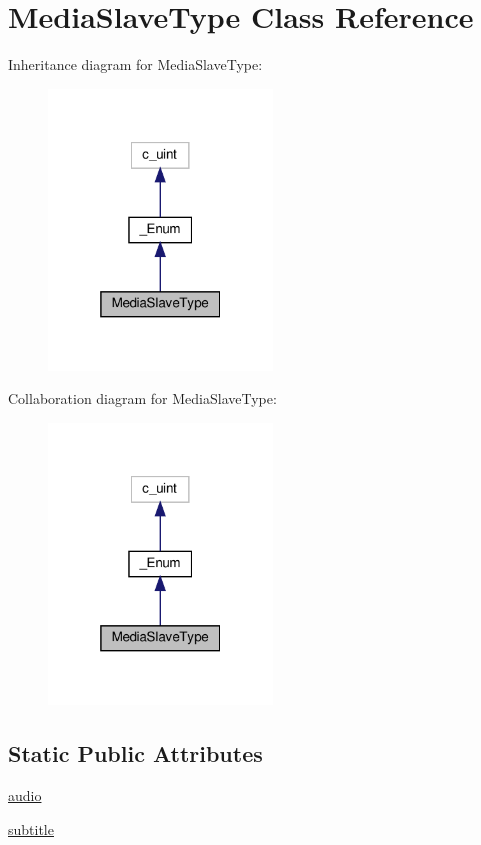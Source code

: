 \hypertarget{classvlc_1_1_media_slave_type}{}\section{Media\+Slave\+Type Class Reference}
\label{classvlc_1_1_media_slave_type}


Inheritance diagram for Media\+Slave\+Type\+:
\nopagebreak
\begin{figure}[H]
\begin{center}
\leavevmode
\includegraphics[width=169pt]{classvlc_1_1_media_slave_type__inherit__graph}
\end{center}
\end{figure}


Collaboration diagram for Media\+Slave\+Type\+:
\nopagebreak
\begin{figure}[H]
\begin{center}
\leavevmode
\includegraphics[width=169pt]{classvlc_1_1_media_slave_type__coll__graph}
\end{center}
\end{figure}
\subsection*{Static Public Attributes}
\begin{DoxyCompactItemize}
\item 
\hyperlink{classvlc_1_1_media_slave_type_ae7198e2df6ed905cb7395d0eff5d5d20}{audio}
\item 
\hyperlink{classvlc_1_1_media_slave_type_acf9c7ca3fce6e014973ed5781029bdfb}{subtitle}
\end{DoxyCompactItemize}
